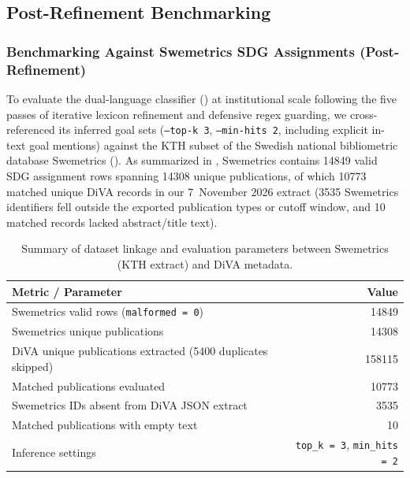 \subsection{Post-Refinement Benchmarking}
\label{sec:benchmarkPostRefinement}

\subsubsection{Benchmarking Against Swemetrics SDG Assignments (Post-Refinement)}
\label{sec:swemetrics_benchmarkPostRefinement}

To evaluate the dual-language classifier () at institutional scale following the five passes of iterative lexicon refinement and defensive regex guarding, we cross-referenced its inferred goal sets (\texttt{--top-k 3}, \texttt{--min-hits 2}, including explicit in-text goal mentions) against the \gls{KTH} subset of the Swedish national bibliometric database Swemetrics (). As summarized in , Swemetrics contains \num{14849} valid \gls{SDG} assignment rows spanning \num{14308} unique publications, of which \num{10773} matched unique \gls{DiVA} records in our 7~November 2026 extract (\num{3535} Swemetrics identifiers fell outside the exported publication types or cutoff window, and \num{10} matched records lacked abstract/title text).

\begin{table}[htbp]
  \centering
  \caption{Summary of dataset linkage and evaluation parameters between Swemetrics (\gls{KTH} extract) and \gls{DiVA} metadata.}
  \label{tab:swemetrics_coveragePostRefinement}
  \begin{tabular}{lr}
    \toprule
    \textbf{Metric / Parameter} & \textbf{Value} \\
    \midrule
    Swemetrics valid rows (\texttt{malformed = 0}) & \num{14849} \\
    Swemetrics unique publications & \num{14308} \\
    \gls{DiVA} unique publications extracted (\num{5400} duplicates skipped) & \num{158115} \\
    Matched publications evaluated & \num{10773} \\
    Swemetrics IDs absent from \gls{DiVA} \gls{JSON} extract & \num{3535} \\
    Matched publications with empty text & \num{10} \\
    Inference settings & \texttt{top\_k = 3}, \texttt{min\_hits = 2} \\
    \bottomrule
  \end{tabular}
\end{table}

